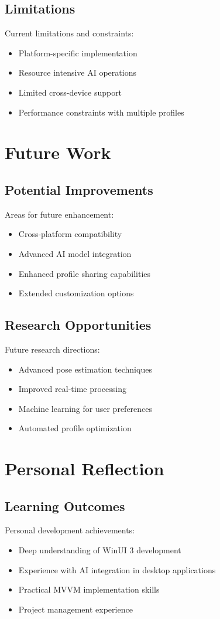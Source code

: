 \subsection{Limitations}
Current limitations and constraints:
\begin{itemize}
    \item Platform-specific implementation
    \item Resource intensive AI operations
    \item Limited cross-device support
    \item Performance constraints with multiple profiles
\end{itemize}

\section{Future Work}
\subsection{Potential Improvements}
Areas for future enhancement:
\begin{itemize}
    \item Cross-platform compatibility
    \item Advanced AI model integration
    \item Enhanced profile sharing capabilities
    \item Extended customization options
\end{itemize}

\subsection{Research Opportunities}
Future research directions:
\begin{itemize}
    \item Advanced pose estimation techniques
    \item Improved real-time processing
    \item Machine learning for user preferences
    \item Automated profile optimization
\end{itemize}

\section{Personal Reflection}
\subsection{Learning Outcomes}
Personal development achievements:
\begin{itemize}
    \item Deep understanding of WinUI 3 development
    \item Experience with AI integration in desktop applications
    \item Practical MVVM implementation skills
    \item Project management experience
\end{itemize}

